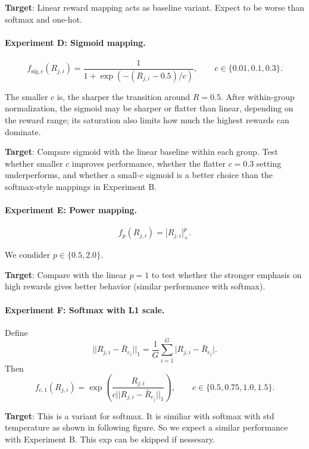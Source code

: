 \documentclass[10pt]{article} %
\begin{document}
\textbf{Target}: Linear reward mapping acts as baseline variant. Expect to be worse than softmax and one-hot.

\paragraph{Experiment D: Sigmoid mapping.}
\[
f_{\mathrm{sig},c}(R_{j,i})
=\frac{1}{1+\exp(-(R_{j,i}-0.5)/c)},
\qquad c\in\{0.01,0.1,0.3\}.
\]

The smaller \(c\) is, the sharper the transition around \(R=0.5\).
After within-group normalization, the sigmoid may be sharper or flatter
than linear, depending on the reward range; its saturation also limits
how much the highest rewards can dominate.

\textbf{Target}: Compare sigmoid with the linear baseline within each group.
Test whether smaller \(c\) improves performance, whether the flatter
\(c=0.3\) setting underperforms, and whether a small-\(c\) sigmoid is a
better choice than the softmax-style mappings in Experiment B.


\paragraph{Experiment E: Power mapping.}

\[
f_p(R_{j,i})=\bigl[R_{j,i}\bigr]_+^p.
\]

We condider \(p\in\{0.5,2.0\}\).

\textbf{Target}: Compare with the linear \(p=1\) to test
whether the stronger emphasis on high rewards gives better behavior (similar
performance with softmax).

\paragraph{Experiment F: Softmax with L1 scale.}
Define
\[
||R_{j,i}-\bar{R}_{c_j}||_1=\frac{1}{G}\sum_{i=1}^{G}
\bigl|R_{j,i}-\bar R_{c_j}\bigr|.
\]
Then
\[
f_{c,1}(R_{j,i})
=\exp\!\left(\frac{R_{j,i}}{c||R_{j,i}-\bar{R}_{c_j}||_1}\right),
\qquad c\in\{0.5,0.75,1.0,1.5\}.
\]


\textbf{Target}: This is a variant for softmax. It is similiar with softmax with std temperature as shown in following figure. So we expect a similar performance with Experiment B. This exp can be skipped if nessesary.
\end{document}
